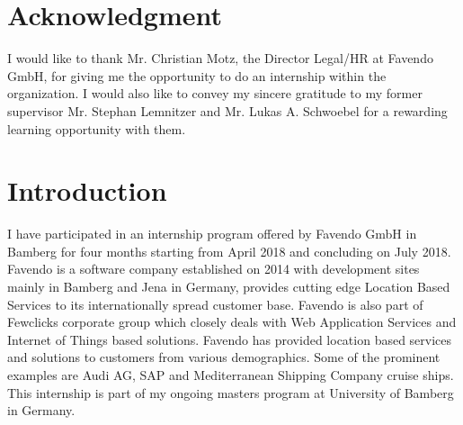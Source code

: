 \section{Acknowledgment}
I would like to thank Mr. Christian Motz, the Director Legal/HR at Favendo GmbH, for giving me the opportunity to do an internship within the organization. I would also like to convey my sincere gratitude to my former supervisor Mr. Stephan Lemnitzer and Mr. Lukas A. Schwoebel for a rewarding learning opportunity with them.

\section{Introduction}
I have participated in an internship program offered by Favendo GmbH \cite{favendoataglance} in Bamberg for four months starting from April 2018 and concluding on July 2018. Favendo is a software company established on 2014 with development sites mainly in Bamberg and Jena in Germany, provides cutting edge Location Based Services to its internationally spread customer base. Favendo is also part of Fewclicks corporate group \cite{fewclicksataglance} which closely deals with Web Application Services and Internet of Things based solutions. Favendo has provided location based services and solutions to customers from various demographics. Some of the prominent examples are Audi AG, SAP and Mediterranean Shipping Company cruise ships. This internship is part of my ongoing masters program at University of Bamberg in Germany.

